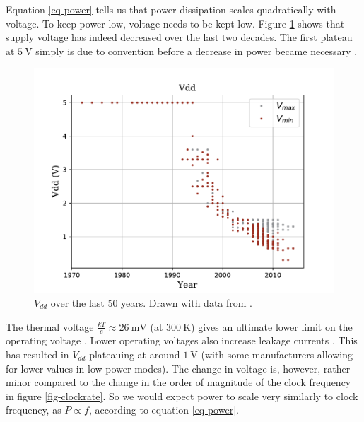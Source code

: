 \documentclass[12pt,a4paper]{article} %
\newcommand{\note}{\textcolor{WildStrawberry}}
\begin{document}
Equation \ref{eq-power} tells us that power dissipation scales quadratically with voltage. To keep power low, voltage needs to be kept low. Figure \ref{fig-vdd} shows that supply voltage has indeed decreased over the last two decades. The first plateau at $\SI{5}{\V}$ simply is due to convention before a decrease in power became necessary \cite{recordingCPUHistory}.
\begin{figure}[!h]
	\centering
	\includegraphics[width=\textwidth]{Source/Vdd.pdf}%
	\caption{$V_{dd}$ over the last 50 years. Drawn with data from \cite{cpudb}.}%
	\label{fig-vdd}
\end{figure}%
The thermal voltage $\frac{kT}{e} \approx \SI{26}{\mV}$ (at $\SI{300}{\kelvin}$) gives an ultimate lower limit on the operating voltage \cite{designNearTheLimits}. Lower operating voltages also increase leakage currents \cite{ComputingsEnergyProblem} \cite{ScalingBelow1Mu}. This has resulted in $V_{dd}$ plateauing at around $\SI{1}{\volt}$ (with some manufacturers allowing for lower values in low-power modes). The change in voltage is, however, rather minor compared to the change in the order of magnitude of the clock frequency in figure \ref{fig-clockrate}. So we would expect power to scale very similarly to clock frequency, as $P\propto f$, according to equation \ref{eq-power}.%
\end{document}
